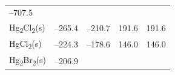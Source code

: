 \documentclass[
]{book}
\theoremstyle{definition}
\theoremstyle{definition}
\theoremstyle{definition}
\theoremstyle{remark}
\begin{document}
\begin{longtable}[]{@{}lllll@{}}
\begin{minipage}[t]{0.19\columnwidth}
--707.5\strut
\end{minipage} & \begin{minipage}[t]{0.20\columnwidth}\raggedright
\strut
\end{minipage} & \begin{minipage}[t]{0.18\columnwidth}\raggedright
\strut
\end{minipage} & \begin{minipage}[t]{0.18\columnwidth}\raggedright
\strut
\end{minipage}\tabularnewline
\begin{minipage}[t]{0.10\columnwidth}\raggedright
Hg\textsubscript{2}Cl\textsubscript{2}(s)\strut
\end{minipage} & \begin{minipage}[t]{0.19\columnwidth}\raggedright
--265.4\strut
\end{minipage} & \begin{minipage}[t]{0.20\columnwidth}\raggedright
--210.7\strut
\end{minipage} & \begin{minipage}[t]{0.18\columnwidth}\raggedright
191.6\strut
\end{minipage} & \begin{minipage}[t]{0.18\columnwidth}\raggedright
191.6\strut
\end{minipage}\tabularnewline
\begin{minipage}[t]{0.10\columnwidth}\raggedright
HgCl\textsubscript{2}(s)\strut
\end{minipage} & \begin{minipage}[t]{0.19\columnwidth}\raggedright
--224.3\strut
\end{minipage} & \begin{minipage}[t]{0.20\columnwidth}\raggedright
--178.6\strut
\end{minipage} & \begin{minipage}[t]{0.18\columnwidth}\raggedright
146.0\strut
\end{minipage} & \begin{minipage}[t]{0.18\columnwidth}\raggedright
146.0\strut
\end{minipage}\tabularnewline
\begin{minipage}[t]{0.10\columnwidth}\raggedright
Hg\textsubscript{2}Br\textsubscript{2}(s)\strut
\end{minipage} & \begin{minipage}[t]{0.19\columnwidth}\raggedright
--206.9\strut
\end{minipage} & \begin{minipage}[t]{0.20\columnwidth}\raggedright

\end{minipage}
\end{longtable}
\end{document}
